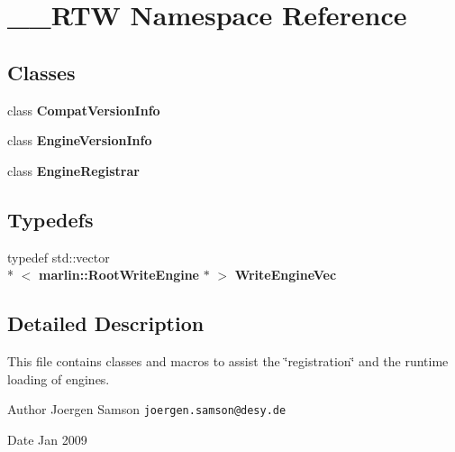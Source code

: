 \section{\-\_\-\-\_\-\-R\-T\-W Namespace Reference}
\label{namespace____RTW}
\subsection*{Classes}
\begin{DoxyCompactItemize}
\item 
class {\bf Compat\-Version\-Info}
\item 
class {\bf Engine\-Version\-Info}
\item 
class {\bf Engine\-Registrar}
\end{DoxyCompactItemize}
\subsection*{Typedefs}
\begin{DoxyCompactItemize}
\item 
typedef std\-::vector\\*
$<$ {\bf marlin\-::\-Root\-Write\-Engine} $\ast$ $>$ {\bfseries Write\-Engine\-Vec}\label{namespace____RTW_a20c9713947b882c127da519485ab5a14}

\end{DoxyCompactItemize}


\subsection{Detailed Description}
This file contains classes and macros to assist the \char`\"{}registration\char`\"{} and the runtime loading of engines. \begin{DoxyAuthor}{Author}
Joergen Samson {\tt joergen.\-samson@desy.\-de} 
\end{DoxyAuthor}
\begin{DoxyDate}{Date}
Jan 2009 
\end{DoxyDate}
